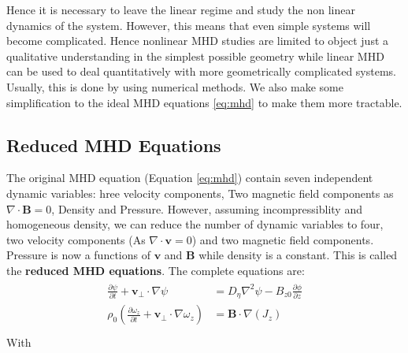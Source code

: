 \documentclass[12pt]{article}
\newenvironment{changemargin}[2]{%
\begin{list}{}{%
\setlength{\topsep}{0pt}%
\setlength{\leftmargin}{#1}%
\setlength{\rightmargin}{#2}%
\setlength{\listparindent}{\parindent}%
\setlength{\itemindent}{\parindent}%
\setlength{\parsep}{\parskip}%
}%
\item[]}{\end{list}}
\begin{document}
\begin{changemargin}{-2cm}{-2cm}
    Hence it is necessary to leave the linear regime and study the non linear dynamics of the system. However, this means that even simple systems will become complicated. Hence nonlinear MHD studies are limited to object just a qualitative understanding in the simplest possible geometry while linear MHD can be used to deal quantitatively with more geometrically complicated systems. Usually, this is done by using numerical methods. We also make some simplification to the ideal MHD equations \ref{eq:mhd} to make them more tractable.\cite{nonlinear-mhd-book}

    \subsection{Reduced MHD Equations}
    The original MHD equation (Equation \ref{eq:mhd}) contain seven independent dynamic variables: hree velocity components, Two magnetic field components as $\nabla \cdot \mathbf{B} = 0$, Density and Pressure.
    However, assuming incompressiblity and homogeneous density, we can reduce the number of dynamic variables to four, two velocity components (As $\nabla \cdot \mathbf{v} = 0$) and two magnetic field components. Pressure is now a functions of $\mathbf{v}$ and $\mathbf{B}$ while density is a constant. This is called the \textbf{reduced MHD equations}. The complete equations are\cite{article3}:
    \begin{align}\label{eq:reduced-mhd-1}
        \begin{split}
            \frac{\partial \psi}{\partial t} + \mathbf{v_\perp}\cdot \nabla \psi&=D_{\eta}\nabla^2\psi - B_{z0}\frac{\partial \phi}{\partial z}\\
            \rho_0\left(\frac{\partial \omega_z}{\partial t} + \mathbf{v_\perp}\cdot \nabla \omega_z \right) & = \mathbf{B}\cdot \nabla (J_z)\\
        \end{split}
    \end{align}
    With
    \begin{align}\label{eq:reduced-mhd-2}
        \begin{split}

\end{split}
\end{align}
\end{changemargin}
\end{document}
